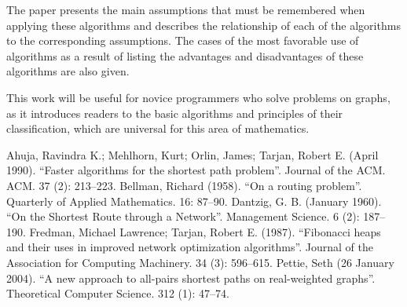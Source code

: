     The paper presents the main assumptions that must be remembered when applying these algorithms and describes the relationship of each of the algorithms to the corresponding assumptions.
    The cases of the most favorable use of algorithms as a result of listing the advantages and disadvantages of these algorithms are also given.

    This work will be useful for novice programmers who solve problems on graphs, as it introduces readers to the basic algorithms and principles of their classification, which are universal for this area of mathematics.
    
    \begin{thebibliography}{9}
        \bibitem{} Ahuja, Ravindra K.; Mehlhorn, Kurt; Orlin, James; Tarjan, Robert E. (April 1990). ``Faster algorithms for the shortest path problem''. Journal of the ACM. ACM. 37 (2): 213–223.
        \bibitem{} Bellman, Richard (1958). ``On a routing problem''. Quarterly of Applied Mathematics. 16: 87–90.
        \bibitem{} Dantzig, G. B. (January 1960). ``On the Shortest Route through a Network''. Management Science. 6 (2): 187–190.
        \bibitem{} Fredman, Michael Lawrence; Tarjan, Robert E. (1987). ``Fibonacci heaps and their uses in improved network optimization algorithms''. Journal of the Association for Computing Machinery. 34 (3): 596–615.
        \bibitem{} Pettie, Seth (26 January 2004). ``A new approach to all-pairs shortest paths on real-weighted graphs''. Theoretical Computer Science. 312 (1): 47–74.
    \end{thebibliography}



